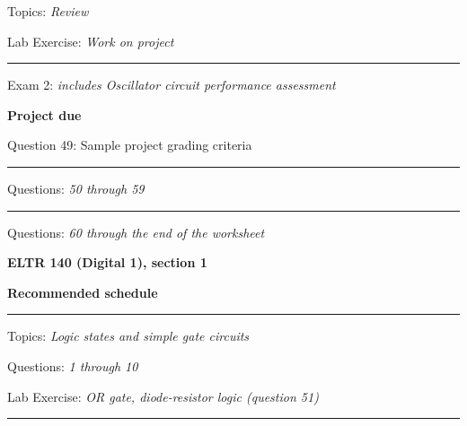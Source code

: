 \hskip 10pt Topics: {\it Review}
 
\hskip 10pt Lab Exercise: {\it Work on project}
 

\vskip 10pt
\hrule \vskip 5pt
\noindent
{}

\hskip 10pt Exam 2: {\it includes Oscillator circuit performance assessment}
 
\hskip 10pt {\bf Project due}

\hskip 10pt Question 49: Sample project grading criteria
 
\vskip 10pt
\hrule \vskip 5pt
\noindent
{}

\hskip 10pt Questions: {\it 50 through 59}
 
\vskip 10pt
\hrule \vskip 5pt
\noindent
{}

\hskip 10pt Questions: {\it 60 through the end of the worksheet}
 
\vskip 10pt








\vfil \eject

\centerline{\bf ELTR 140 (Digital 1), section 1} \bigskip 
 
\vskip 10pt

\noindent
{\bf Recommended schedule}

\vskip 5pt

\hrule \vskip 5pt
\noindent
{}

\hskip 10pt Topics: {\it Logic states and simple gate circuits}
 
\hskip 10pt Questions: {\it 1 through 10}
 
\hskip 10pt Lab Exercise: {\it OR gate, diode-resistor logic (question 51)}
 



\vskip 10pt
\hrule \vskip 5pt
\noindent
{}

